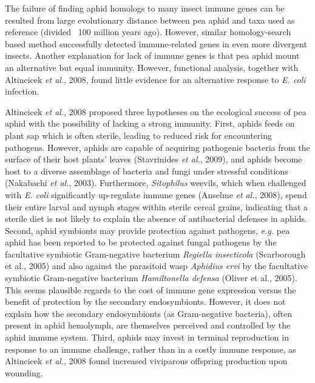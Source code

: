 \documentclass[11pt]{article}
\begin{document}
\newline

The failure of finding aphid homologs to many insect immune genes can be resulted from large evolutionary distance between pea aphid and taxa used as reference (divided ~100 million years ago). 
However, similar homology-search based method successfully detected immune-related genes in even more divergent insects. 
Another explanation for lack of immune genes is that pea aphid mount an alternative but equal immunity. 
However, functional analysis, together with Altincicek \textit{et al.}, 2008, found little evidence for an alternative response to \textit{E. coli} infection. 

\newline

Altincicek \textit{et al.}, 2008 proposed three hypotheses on the ecological success of pea aphid with the possibility of lacking a strong immunity. 
First, aphids feeds on plant sap which is often sterile, leading to reduced risk for encountering pathogens. 
However, aphids are capable of acquiring pathogenic bacteria from the surface of their host plants’ leaves (Stavrinides \textit{et al.}, 2009), and aphids become host to a diverse assemblage of bacteria and fungi under stressful conditions (Nakabachi \textit{et al.}, 2003). 
Furthermore, \textit{Sitophilus} weevils, which when challenged with \textit{E. coli} significantly up-regulate immune genes (Anselme \textit{et al.}, 2008), spend their entire larval and nymph stages within sterile cereal grains, indicating that a sterile diet is not likely to explain the absence of antibacterial defenses in aphids. 
Second, aphid symbionts may provide protection against pathogens, \textit{e.g.} pea aphid has been reported to be protected against fungal pathogens by the facultative symbiotic Gram-negative bacterium \textit{Regiella insecticola} (Scarborough et al., 2005) and also against the parasitoid wasp \textit{Aphidius ervi} by the facultative symbiotic Gram-negative bacterium \textit{Hamiltonella defensa} (Oliver et al., 2005). 
This seems plausible regards to the cost of immune gene expression versus the benefit of protection by the secondary endosymbionts. 
However, it does not explain how the secondary endosymbionts (as Gram-negative bacteria), often present in aphid hemolymph, are themselves perceived and controlled by the aphid immune system.
Third, aphids may invest in terminal reproduction in response to an immune challenge, rather than in a costly immune response, as Altincicek \textit{et al.}, 2008 found increased viviparous offspring production upon wounding. 
\end{document}
